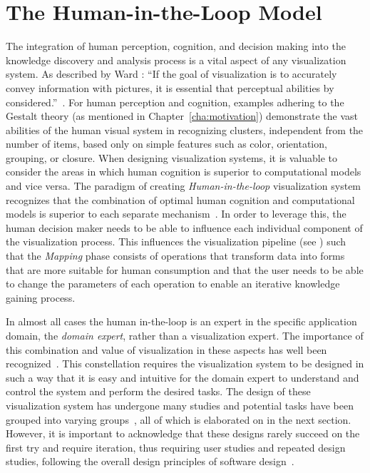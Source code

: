 \section{The Human-in-the-Loop Model} \label{cha:intro:hitl}
The integration of human perception, cognition, and decision making into the knowledge discovery and analysis process is a vital aspect of any visualization system.  As described by Ward \etal : ``If the goal of visualization is to accurately convey information with pictures, it is essential that perceptual abilities by considered.''~\cite{ward2010interactive}.  For human perception and cognition, examples adhering to the Gestalt theory (as mentioned in Chapter~\ref{cha:motivation}) demonstrate the vast abilities of the human visual system in recognizing clusters, independent from the number of items, based only on simple features such as color, orientation, grouping, or closure.  When designing visualization systems, it is valuable to consider the areas in which human cognition is superior to computational models and vice versa.  The paradigm of creating \emph{Human-in-the-loop} visualization system recognizes that the combination of optimal human cognition and computational models is superior to each separate mechanism~\cite{munzner2014visualization}.  In order to leverage this, the human decision maker needs to be able to influence each individual component of the visualization process.  This influences the visualization pipeline (see ) such that the \emph{Mapping} phase consists of operations that transform data into forms that are more suitable for human consumption and that the user needs to be able to change the parameters of each operation to enable an iterative knowledge gaining process.

In almost all cases the human in-the-loop is an expert in the specific application domain, the \emph{domain expert}, rather than a visualization expert.  The importance of this combination and value of visualization in these aspects has well been recognized~\cite{van2005value}.  This constellation requires the visualization system to be designed in such a way that it is easy and intuitive for the domain expert to understand and control the system and perform the desired tasks.  The design of these visualization system has undergone many studies and potential tasks have been grouped into varying groups~\cite{brehmer2014visualizing}, all of which is elaborated on in the next section.  However, it is important to acknowledge that these designs rarely succeed on the first try and require iteration, thus requiring user studies and repeated design studies, following the overall design principles of software design~\cite{larman2003iterative}.



